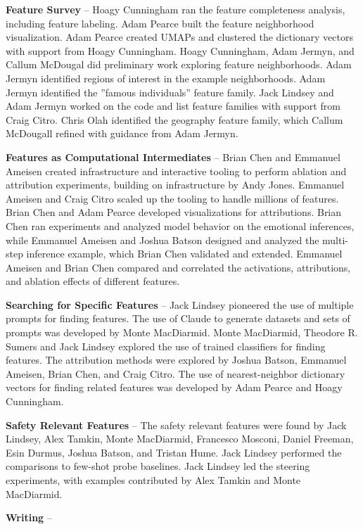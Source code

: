 \documentclass{article}
\begin{document}
\textbf{Feature Survey} -- Hoagy Cunningham ran the feature completeness analysis, including feature labeling. Adam Pearce built the feature neighborhood visualization. Adam Pearce created UMAPs and clustered the dictionary vectors with support from Hoagy Cunningham. Hoagy Cunningham, Adam Jermyn, and Callum McDougal did preliminary work exploring feature neighborhoods. Adam Jermyn identified regions of interest in the example neighborhoods. Adam Jermyn identified the ''famous individuals” feature family. Jack Lindsey and Adam Jermyn worked on the code and list feature families with support from Craig Citro. Chris Olah identified the geography feature family, which Callum McDougall refined with guidance from Adam Jermyn.

\textbf{Features as Computational Intermediates}  -- Brian Chen and Emmanuel Ameisen created infrastructure and interactive tooling to perform ablation and attribution experiments, building on infrastructure by Andy Jones. Emmanuel Ameisen and Craig Citro scaled up the tooling to handle millions of features. Brian Chen and Adam Pearce developed visualizations for attributions. Brian Chen ran experiments and analyzed model behavior on the emotional inferences, while Emmanuel Ameisen and Joshua Batson designed and analyzed the multi-step inference example, which Brian Chen validated and extended. Emmanuel Ameisen and Brian Chen compared and correlated the activations, attributions, and ablation effects of different features.

\textbf{Searching for Specific Features} -- Jack Lindsey pioneered the use of multiple prompts for finding features. The use of Claude to generate datasets and sets of prompts was developed by Monte MacDiarmid. Monte MacDiarmid, Theodore R. Sumers and Jack Lindsey explored the use of trained classifiers for finding features. The attribution methods were explored by Joshua Batson, Emmanuel Ameisen, Brian Chen, and Craig Citro. The use of nearest-neighbor dictionary vectors for finding related features was developed by Adam Pearce and Hoagy Cunningham.

\textbf{Safety Relevant Features} -- The safety relevant features were found by Jack Lindsey, Alex Tamkin, Monte MacDiarmid, Francesco Mosconi, Daniel Freeman, Esin Durmus, Joshua Batson, and Tristan Hume. Jack Lindsey performed the comparisons to few-shot probe baselines. Jack Lindsey led the steering experiments, with examples contributed by Alex Tamkin and Monte MacDiarmid.


\textbf{Writing} --
\end{document}
